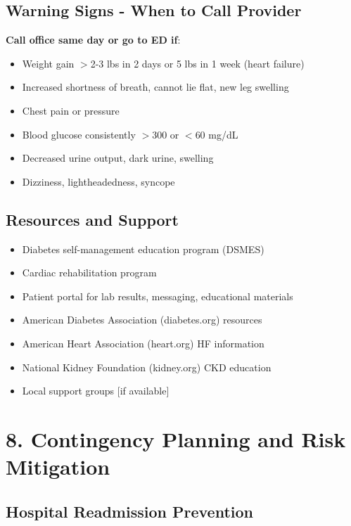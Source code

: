 \documentclass[11pt,letterpaper]{article}
\begin{document}
\subsection*{Warning Signs - When to Call Provider}

\textbf{Call office same day or go to ED if}:
\begin{itemize}[leftmargin=*]
    \item Weight gain $>$2-3 lbs in 2 days or 5 lbs in 1 week (heart failure)
    \item Increased shortness of breath, cannot lie flat, new leg swelling
    \item Chest pain or pressure
    \item Blood glucose consistently $>$300 or $<$60 mg/dL
    \item Decreased urine output, dark urine, swelling
    \item Dizziness, lightheadedness, syncope
\end{itemize}

\subsection*{Resources and Support}

\begin{itemize}[leftmargin=*]
    \item Diabetes self-management education program (DSMES)
    \item Cardiac rehabilitation program
    \item Patient portal for lab results, messaging, educational materials
    \item American Diabetes Association (diabetes.org) resources
    \item American Heart Association (heart.org) HF information
    \item National Kidney Foundation (kidney.org) CKD education
    \item Local support groups [if available]
\end{itemize}

\section*{8. Contingency Planning and Risk Mitigation}

\subsection*{Hospital Readmission Prevention}
\end{document}

